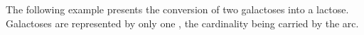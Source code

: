 \begin{center}
\end{center}

The following example presents the conversion of two galactoses into a lactose. Galactoses are represented by only one , the cardinality being carried by the  arc.

\begin{center}
\end{center}

\normalcolor
